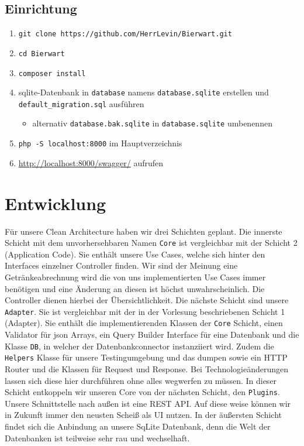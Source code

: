 \documentclass[12pt,a4paper,titlepage,ngerman,pdftex]{report}
\begin{document}
    \section{Einrichtung}\label{sec:einrichtung}

    \begin{enumerate}
        \item \texttt{git clone https://github.com/HerrLevin/Bierwart.git}
        \item \texttt{cd Bierwart}
        \item \texttt{composer install}
        \item sqlite-Datenbank in \texttt{database} namens \texttt{database.sqlite} erstellen und\\ \texttt{default\_migration.sql} ausführen
        \begin{itemize}
            \item alternativ \texttt{database.bak.sqlite} in \texttt{database.sqlite} umbenennen
        \end{itemize}
        \item \texttt{php -S localhost:8000} im Hauptverzeichnis
        \item \url{http://localhost:8000/swagger/} aufrufen
    \end{enumerate}


    \chapter{Entwicklung}\label{ch:entwicklung}

    Für unsere Clean Architecture haben wir drei Schichten geplant.
    Die innerste Schicht mit dem unvorhersehbaren Namen \verb|Core| ist vergleichbar mit der Schicht 2 (Application Code).
    Sie enthält unsere Use Cases, welche sich hinter den Interfaces einzelner Controller finden.
    Wir sind der Meinung eine Getränkeabrechnung wird die von uns implementierten Use Cases immer benötigen und eine Änderung an diesen ist höchst unwahrscheinlich.
    Die Controller dienen hierbei der Übersichtlichkeit.
    Die nächste Schicht sind unsere \verb|Adapter|.
    Sie ist vergleichbar mit der in der Vorlesung beschriebenen Schicht 1 (Adapter).
    Sie enthält die implementierenden Klassen der \verb|Core| Schicht, einen Validator für json Arrays, ein Query Builder Interface für eine Datenbank und die Klasse \verb|DB|, in welcher der Datenbankconnector instanziiert wird.
    Zudem die \verb|Helpers| Klasse für unsere Testingumgebung und das dumpen sowie ein HTTP Router und die Klassen für Request und Response.
    Bei Technologieänderungen lassen sich diese hier durchführen ohne alles wegwerfen zu müssen.
    In dieser Schicht entkoppeln wir unseren Core von der nächsten Schicht, den \verb|Plugins|.
    Unsere Schnittstelle nach außen ist eine REST API.
    Auf diese weise können wir in Zukunft immer den neusten Scheiß als UI nutzen.
    In der äußersten Schicht findet sich die Anbindung an unsere SqLite Datenbank, denn die Welt der Datenbanken ist teilweise sehr rau und wechselhaft.
\end{document}
